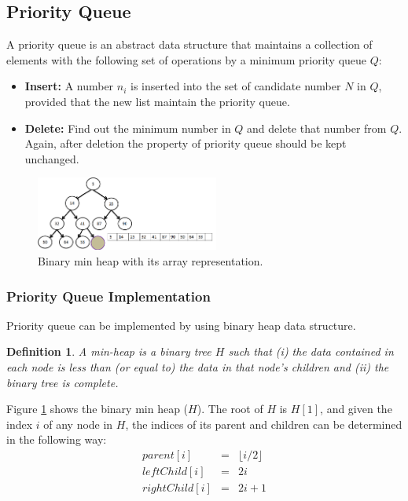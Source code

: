 \documentclass[10pt, conference, compsocconf]{IEEEtran}
\newtheorem{definition}{Definition}[section]
\begin{document}
\subsection{Priority Queue}
A priority queue is an abstract data structure that maintains a collection of elements with the following set of
operations by a minimum priority queue $Q$:
\begin{itemize}
\item {\bf Insert: } A number $n_i$ is inserted into the set of candidate number $N$ in $Q$, provided that the new list maintain the priority queue.

\item {\bf Delete:} Find out the minimum number in $Q$ and delete that number from $Q$. Again, after deletion the property of priority queue should be kept unchanged.
\end{itemize}


\begin{figure}[h]
  \centering
  \includegraphics[width=6cm]{Figures/fig2.png}
      \caption{Binary min heap with its array representation.}
    \label{fig2}
\end{figure}

\subsubsection{Priority Queue Implementation}
Priority queue can be implemented by using binary heap data structure.
\begin{definition}
A min-heap is a binary tree $H$ such that (i) the data contained in each node is less than (or equal to) the data in that node’s children and (ii) the binary tree is complete.
\end{definition}

Figure \ref{fig2} shows the binary min heap ($H$). The root of $H$ is $H[1]$, and given the index $i$ of any node in $H$, the indices of its parent and children can be determined in the following way:
\begin{eqnarray*}
parent[i] &=&  \lfloor i/2 \rfloor \\
leftChild[i] &=& 2i\\
rightChild[i] &=& 2i + 1
\end{eqnarray*}
\end{document}
